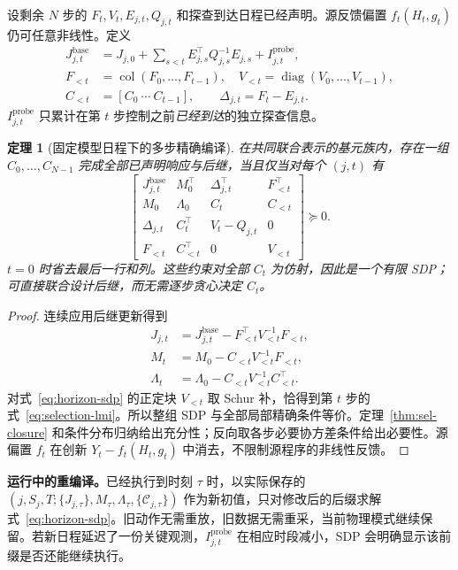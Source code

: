 \documentclass[UTF8,fontset=fandol,11pt,a4paper]{ctexart}
\newtheorem{theorem}{定理}[section]
\theoremstyle{definition}
\theoremstyle{remark}
\numberwithin{equation}{section}
\begin{document}
设剩余 $N$ 步的 $F_t,V_t,E_{j,t},Q_{j,t}$ 和探查到达日程已经声明。源反馈偏置 $f_t(H_t,g_t)$ 仍可任意非线性。定义
\begin{align}
 J^{\mathrm{base}}_{j,t}
 &=J_{j,0}+\sum_{s<t}E_{j,s}^\top Q_{j,s}^{-1}E_{j,s}
   +I^{\mathrm{probe}}_{j,t},\\
 F_{<t}&=\operatorname{col}(F_0,\ldots,F_{t-1}),\quad
 V_{<t}=\operatorname{diag}(V_0,\ldots,V_{t-1}),\\
 C_{<t}&=[C_0\ \cdots\ C_{t-1}],\qquad
 \Delta_{j,t}=F_t-E_{j,t}.
\end{align}
$I^{\mathrm{probe}}_{j,t}$ 只累计在第 $t$ 步控制之前\emph{已经到达}的独立探查信息。

\begin{theorem}[固定模型日程下的多步精确编译]
\label{thm:horizon-sdp}
在共同联合表示的基元族内，存在一组 $C_0,\ldots,C_{N-1}$ 完成全部已声明响应与后继，当且仅当对每个 $(j,t)$ 有
\begin{equation}
 \boxed{
 \begin{bmatrix}
 J^{\mathrm{base}}_{j,t}&M_0^\top&\Delta_{j,t}^\top&F_{<t}^\top\\
 M_0&\Lambda_0&C_t&C_{<t}\\
 \Delta_{j,t}&C_t^\top&V_t-Q_{j,t}&0\\
 F_{<t}&C_{<t}^\top&0&V_{<t}
 \end{bmatrix}\succeq0.}
 \label{eq:horizon-sdp}
\end{equation}
$t=0$ 时省去最后一行和列。这些约束对全部 $C_t$ 为仿射，因此是一个有限 SDP；可直接联合设计后继，而无需逐步贪心决定 $C_t$。
\end{theorem}

\begin{proof}
连续应用后继更新得到
\begin{align*}
 J_{j,t}&=J^{\mathrm{base}}_{j,t}-F_{<t}^\top V_{<t}^{-1}F_{<t},\\
 M_t&=M_0-C_{<t}V_{<t}^{-1}F_{<t},\\
 \Lambda_t&=\Lambda_0-C_{<t}V_{<t}^{-1}C_{<t}^\top.
\end{align*}
对式~\eqref{eq:horizon-sdp} 的正定块 $V_{<t}$ 取 Schur 补，恰得到第 $t$ 步的式~\eqref{eq:selection-lmi}。所以整组 SDP 与全部局部精确条件等价。定理~\ref{thm:sel-closure} 和条件分布归纳给出充分性；反向取各步必要协方差条件给出必要性。源偏置 $f_t$ 在创新 $Y_t-f_t(H_t,g_t)$ 中消去，不限制源程序的非线性反馈。
\end{proof}

\textbf{运行中的重编译。}已经执行到时刻 $\tau$ 时，以实际保存的
$(j,S_j,T;\{J_{j,\tau}\},M_\tau,\Lambda_\tau,\{\mathcal C_{j,\tau}\})$
作为新初值，只对修改后的后缀求解式~\eqref{eq:horizon-sdp}。旧动作无需重放，旧数据无需重采，当前物理模式继续保留。若新日程延迟了一份关键观测，$I^{\mathrm{probe}}_{j,t}$ 在相应时段减小，SDP 会明确显示该前缀是否还能继续执行。
\end{document}
